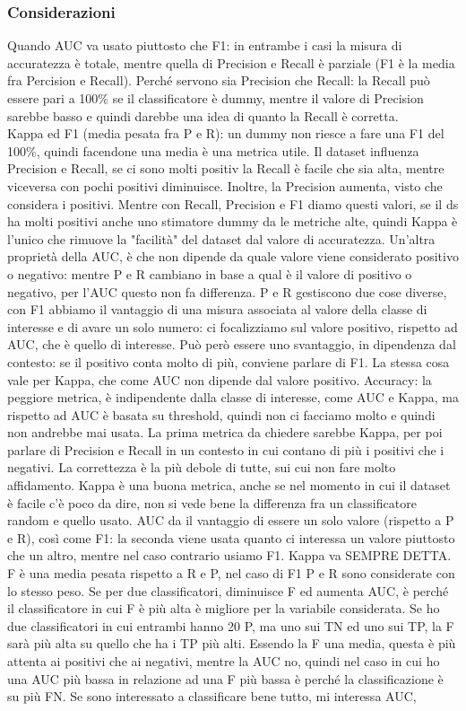 \documentclass{article}
\begin{document}
\subsubsection{Considerazioni}
Quando AUC va usato piuttosto che F1: in entrambe i casi la misura di accuratezza è totale, mentre quella di Precision e Recall è parziale (F1 è la media fra Percision e Recall). Perché servono sia Precision che Recall: la Recall può essere pari a 100\% se il classificatore è dummy, mentre il valore di Precision sarebbe basso e quindi darebbe una idea di quanto la Recall è corretta.\\ Kappa ed F1 (media pesata fra P e R): un dummy non riesce a fare una F1 del 100\%, quindi facendone una media è una metrica utile. Il dataset influenza Precision e Recall, se ci sono molti positiv la Recall è facile che sia alta, mentre viceversa con pochi positivi diminuisce. Inoltre, la Precision aumenta, visto che considera i positivi. Mentre con Recall, Precision e F1 diamo questi valori, se il ds ha molti positivi anche uno stimatore dummy da le metriche alte, quindi Kappa è l'unico che rimuove la "facilità" del dataset dal valore di accuratezza. Un'altra proprietà della AUC, è che non dipende da quale valore viene considerato positivo o negativo: mentre P e R cambiano in base a qual è il valore di positivo o negativo, per l'AUC questo non fa differenza. P e R gestiscono due cose diverse, con F1 abbiamo il vantaggio di una misura associata al valore della classe di interesse e di avare un solo numero: ci focalizziamo sul valore positivo, rispetto ad AUC, che è quello di interesse. Può però essere uno svantaggio, in dipendenza dal contesto: se il positivo conta molto di più, conviene parlare di F1. La stessa cosa vale per Kappa, che come AUC non dipende dal valore positivo. Accuracy: la peggiore metrica, è indipendente dalla classe di interesse, come AUC e Kappa, ma rispetto ad AUC è basata su threshold, quindi non ci facciamo molto e quindi non andrebbe mai usata. La prima metrica da chiedere sarebbe Kappa, per poi parlare di Precision e Recall in un contesto in cui contano di più i positivi che i negativi. La correttezza è la più debole di tutte, sui cui non fare molto affidamento. Kappa è una buona metrica, anche se nel momento in cui il dataset è facile c'è poco da dire, non si vede bene la differenza fra un classificatore random e quello usato. AUC da il vantaggio di essere un solo valore (rispetto a P e R), così come F1: la seconda viene usata quanto ci interessa un valore piuttosto che un altro, mentre nel caso contrario usiamo F1. Kappa va SEMPRE DETTA. F è una media pesata rispetto a R e P, nel caso di F1 P e R sono considerate con lo stesso peso. Se per due classificatori, diminuisce F ed aumenta AUC, è perché il classificatore in cui F è più alta è migliore per la variabile considerata. Se ho due classificatori in cui entrambi hanno 20 P, ma uno sui TN ed uno sui TP, la F sarà più alta su quello che ha i TP più alti. Essendo la F una media, questa è più attenta ai positivi che ai negativi, mentre la AUC no, quindi nel caso in cui ho una AUC più bassa in relazione ad una F più bassa è perché la classificazione è su più FN. Se sono interessato a classificare bene tutto, mi interessa AUC, 
\end{document}
